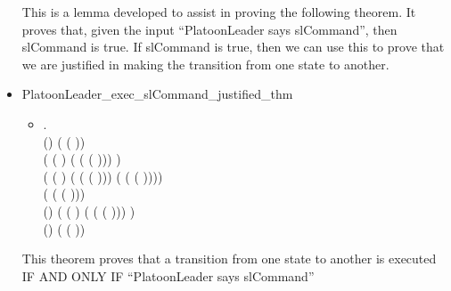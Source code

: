 \begin{itemize}
\begin{itemize}
 \end{itemize}
 This is a lemma developed to assist in proving the following theorem. It proves that,
 given the input “PlatoonLeader says slCommand”, then slCommand is true. If slCommand is
 true, then we can use this to prove that we are justified in making the transition
 from one state to another.
\item PlatoonLeader_exec_slCommand_justified_thm
  \begin{itemize}
    \item[] \HOLTokenTurnstile{} \HOLSymConst{\HOLTokenForall{}}    .\\
      (\HOLSymConst{,}\HOLSymConst{,}) ( ( ))\\
       (   ( )
          (    ( ( ))\HOLSymConst{::}) 
          )\\
       (   ( )
           (  ( ( )))
          (  ( ( ))\HOLSymConst{::})) \HOLSymConst{\HOLTokenEquiv{}}\\
       (    ( ( ))) \HOLSymConst{\HOLTokenConj{}}\\
      (\HOLSymConst{,}\HOLSymConst{,})
       (   ( )
          (    ( ( ))\HOLSymConst{::}) 
          ) \HOLSymConst{\HOLTokenConj{}}\\ (\HOLSymConst{,}\HOLSymConst{,})   ( ( ))
        \end{itemize}
        This theorem proves that a transition from one state to another
        is executed IF AND ONLY IF “PlatoonLeader says slCommand”
\end{itemize}


